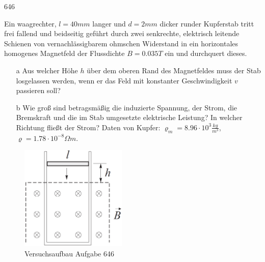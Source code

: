 \begin{auf}
    646
\end{auf}
Ein waagrechter, $l=40 mm$ langer und $d=2mm$ dicker runder Kupferstab tritt
frei fallend und beidseitig geführt durch zwei senkrechte, elektrisch leitende Schienen von vernachlässigbarem ohmschen Widerstand in ein horizontales homogenes
Magnetfeld der Flussdichte $B=0.035T$ ein und durchquert dieses.
\begin{enumerate}
    \item[a] Aus welcher Höhe $h$ über dem oberen Rand des Magnetfeldes muss der Stab losgelassen werden, wenn er das Feld mit konstanter Geschwindigkeit	$v$ passieren soll?
    \item[b] Wie groß sind betragsmäßig die induzierte Spannung, der Strom, die Bremskraft und die im Stab umgesetzte elektrische Leistung? In welcher Richtung fließt der Strom? Daten von	Kupfer: $\varrho_m=8.96\cdot10^3\frac{kg}{m^3}$, $\varrho=1.78\cdot10^{-8}\Omega m$.
\end{enumerate}
\begin{figure}[h]
    \centering
    \includegraphics[height=5cm]{images/646_0.png}
    \caption{Versuchsaufbau Aufgabe 646}
\end{figure}